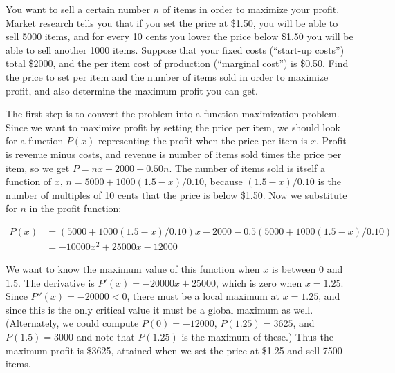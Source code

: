 \begin{example}
You want to sell a certain number $n$ of items in order to maximize your
profit.  Market research tells you that if you set the price at \$1.50, you
will be able to sell 5000 items, and for every 10 cents you lower the price
below \$1.50 you will be able to sell another 1000 items.  Suppose that
your fixed costs (``start-up costs'') total \$2000, and the per item cost
of production (``marginal cost'') is \$0.50.  Find the price to set per
item and the number of items sold in order to maximize profit, and also
determine the maximum profit you can get.
\end{example}

\begin{solution}
The first step is to convert the problem into a function maximization
problem. Since we want to maximize profit by setting the price per
item, we should look for a function $P(x)$ representing the profit
when the price per item is $x$. Profit is revenue minus costs, and
revenue is number of items sold times the price per item, so we get
$P=nx-2000-0.50n$. The number of items sold is itself a function of
$x$, $n=5000+1000(1.5-x)/0.10$, because $ (1.5-x)/0.10$ is the number
of multiples of 10 cents that the price is below \$1.50.
Now we substitute for $n$ in the profit function:

\begin{align*}
  P(x) &= (5000+1000(1.5-x)/0.10)x-2000- 0.5(5000+1000(1.5-x)/0.10) \\
       &=-10000x^2+25000x-12000 
\end{align*}

We want to know the maximum value of this function when $x$ is
between 0 and $1.5$. The derivative is $P'(x)=-20000x+25000$, which
is zero when $x=1.25$. Since $P''(x)=-20000<0$, there must be a local
maximum at $x=1.25$, and since this is the only critical value it must
be a global maximum as well. (Alternately, we could compute
$P(0)=-12000$, $P(1.25)=3625$, and $P(1.5)=3000$ and note that
$P(1.25)$ is the maximum of these.) Thus the maximum profit is \$3625,
attained when we set the price at \$1.25 and sell 7500 items.
\end{solution}



